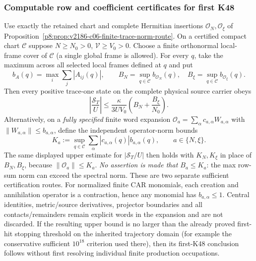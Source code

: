 \documentclass[12pt,a4paper]{article}
\begin{document}
\subsubsection{Computable row and coefficient certificates for first K48}
\label{p8:subsec:v2188-trace-coefficient-certificate}
\begin{proposition}
\label{p8:prop:v2188-trace-coefficient-certificate}
Use exactly the retained chart and complete Hermitian insertions
$\mathcal O_N,\mathcal O_\xi$ of
Proposition~\ref{p8:prop:v2186-c06-finite-trace-norm-route}.
On a certified compact chart $\mathscr C$ suppose
$N\ge N_0>0$, $\mathcal V\ge V_0>0$. Choose a finite orthonormal local-frame cover of $\mathscr C$ (a single
global frame is allowed). For every $q$, take the maximum across all
selected local frames defined at $q$ and put
\[
 b_A(q)=\max_i\sum_j |A_{ij}(q)|,\qquad
 B_N=\sup_{q\in\mathscr C}b_{\mathcal O_N}(q),\quad
 B_\xi=\sup_{q\in\mathscr C}b_{\mathcal O_\xi}(q).
\]
Then every positive trace-one state on the complete physical source
carrier obeys
\[
 \boxed{\left|\frac{\mathcal S_T}{U}\right|
 \le\frac{\kappa}{3UV_0}
       \left(B_N+\frac{B_\xi}{N_0}\right).}
\]
Alternatively, on a \emph{fully specified} finite word expansion
$\mathcal O_a=\sum_\alpha c_{a,\alpha}W_{a,\alpha}$ with
$\|W_{a,\alpha}\|\le b_{a,\alpha}$, define the independent
operator-norm bounds
\[
 K_a:=\sup_{q\in\mathscr C}
      \sum_\alpha |c_{a,\alpha}(q)| b_{a,\alpha}(q),
 \qquad a\in\{N,\xi\}.
\]
The same displayed upper estimate for $|\mathcal S_T/U|$ then holds
with \(K_N,K_\xi\) in place of \(B_N,B_\xi\), because
\(\|\mathcal O_a\|\le K_a\). \emph{No assertion is made that
\(B_a\le K_a\)}: the max row-sum norm can exceed the spectral norm.
These are two separate sufficient certification routes. For normalized finite CAR monomials, each creation
and annihilation operator is a contraction, hence any monomial has
$b_{a,\alpha}\le1$. Central identities, metric/source derivatives,
projector boundaries and all contacts/remainders remain explicit words
in the expansion and are not discarded.
If the resulting upper bound is no larger than the already proved
first-hit stopping threshold on the inherited trajectory domain (for
example the conservative sufficient $10^{18}$ criterion used there),
then its first-K48 conclusion follows without first resolving
individual finite production occupations.
\end{proposition}
\end{document}

